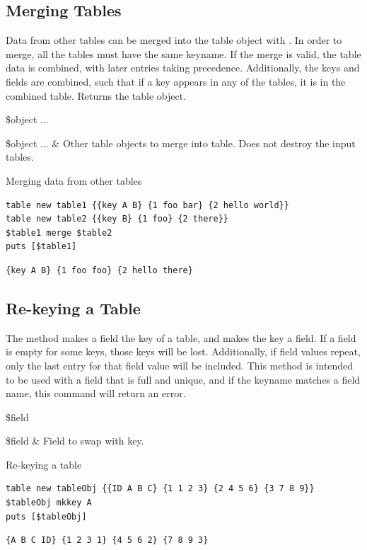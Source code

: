 \subsection{Merging Tables}
Data from other tables can be merged into the table object with . 
In order to merge, all the tables must have the same keyname.
If the merge is valid, the table data is combined, with later entries taking precedence. 
Additionally, the keys and fields are combined, such that if a key appears in any of the tables, it is in the combined table.
Returns the table object.

\begin{syntax}
 \$object ...
\end{syntax}
\begin{args}
\$object ... & Other table objects to merge into table. Does not destroy the input tables. 
\end{args}

\begin{example}{Merging data from other tables}
\begin{lstlisting}
table new table1 {{key A B} {1 foo bar} {2 hello world}}
table new table2 {{key B} {1 foo} {2 there}}
$table1 merge $table2
puts [$table1]
\end{lstlisting}
\tcblower
\begin{lstlisting}
{key A B} {1 foo foo} {2 hello there}
\end{lstlisting}
\end{example}
\clearpage
\subsection{Re-keying a Table}
The method  makes a field the key of a table, and makes the key a field. 
If a field is empty for some keys, those keys will be lost. 
Additionally, if field values repeat, only the last entry for that field value will be included. 
This method is intended to be used with a field that is full and unique, and if the keyname matches a field name, this command will return an error.
\begin{syntax}
 \$field
\end{syntax}
\begin{args}
\$field & Field to swap with key.
\end{args}

\begin{example}{Re-keying a table}
\begin{lstlisting}
table new tableObj {{ID A B C} {1 1 2 3} {2 4 5 6} {3 7 8 9}}
$tableObj mkkey A
puts [$tableObj]
\end{lstlisting}
\tcblower
\begin{lstlisting}
{A B C ID} {1 2 3 1} {4 5 6 2} {7 8 9 3}
\end{lstlisting}
\end{example}
\clearpage
